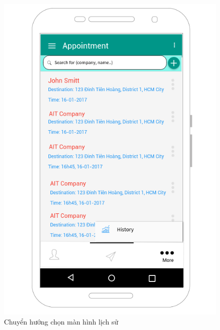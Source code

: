 \documentclass[a4paper]{article}
\begin{document}
\begin{figure}[h]
    \includegraphics[scale=0.6]{Mockup/HI_redirecthistory}
    \centering
    \caption{Chuyển hướng chọn màn hình lịch sử}
    \label{fig:HI_redirecthistory}
\end{figure}
\end{document}
